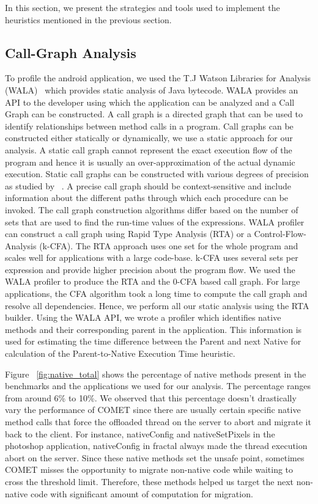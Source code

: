 In this section, we present the strategies and tools used to implement the heuristics mentioned in the previous section.
\subsection{Call-Graph Analysis}
To profile the android application, we used the T.J Watson Libraries for Analysis (WALA)~\cite{wala} which provides static analysis
of Java bytecode. WALA provides an API to the developer using which the application can be analyzed and a Call Graph can be
constructed. A call graph is a directed graph that can be used to identify relationships between method calls in a program.
Call graphs can be constructed either statically or dynamically, we use a static approach for our analysis. A static
call graph cannot represent the exact execution flow of the program and hence it is usually an over-approximation of
the actual dynamic execution. Static call graphs can be constructed with various degrees of precision as studied by
~\cite{cgbuild}. A precise call graph should be context-sensitive and include information about the different paths through which
each procedure can be invoked. The call graph construction algorithms differ based on the number of sets that are used to find the
run-time values of the expressions. WALA profiler can construct a call graph using Rapid Type Analysis (RTA) or a Control-Flow-Analysis
(k-CFA). The RTA approach uses one set for the whole program and scales well for applications with a large code-base. k-CFA uses
several sets per expression and provide higher precision about the program flow.
We used the WALA profiler to produce the RTA and the 0-CFA based call graph. For large applications, the CFA algorithm took a long time to
compute the call graph and resolve all dependencies. Hence, we perform all our static analysis using the RTA builder. Using the WALA API,
we wrote a profiler which identifies native methods and their corresponding parent in the application.
This information is used for estimating the time difference between the Parent and next Native for calculation of the Parent-to-Native Execution
Time heuristic.

Figure ~\ref{fig:native_total} shows the percentage of native methods present in the benchmarks and the applications we used for our analysis.
The percentage ranges from around 6\% to 10\%. We observed that this percentage doesn't drastically vary the performance of COMET since there
are usually certain specific native method calls that force the offloaded thread on the server to abort and migrate it back to the client. For instance, nativeConfig
and nativeSetPixels in the photoshop application, nativeConfig in fractal always made the thread execution abort on the server. Since these native methods set the unsafe point, sometimes COMET misses the opportunity to migrate non-native code while waiting to cross the threshold limit. Therefore, these methods helped us target the next non-native code with significant amount of computation for migration.

